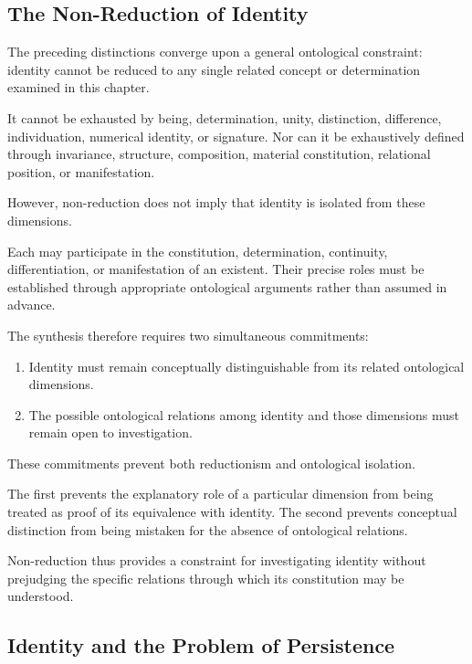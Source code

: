 \subsection{The Non-Reduction of Identity}

The preceding distinctions converge upon a general
ontological constraint: identity cannot be reduced
to any single related concept or determination
examined in this chapter.

It cannot be exhausted by being, determination,
unity, distinction, difference, individuation,
numerical identity, or signature. Nor can it be
exhaustively defined through invariance, structure,
composition, material constitution, relational
position, or manifestation.

However, non-reduction does not imply that identity
is isolated from these dimensions.

Each may participate in the constitution,
determination, continuity, differentiation, or
manifestation of an existent. Their precise roles
must be established through appropriate ontological
arguments rather than assumed in advance.

The synthesis therefore requires two simultaneous
commitments:

\begin{enumerate}
    \item Identity must remain conceptually
    distinguishable from its related ontological
    dimensions.

    \item The possible ontological relations among
    identity and those dimensions must remain open
    to investigation.
\end{enumerate}

These commitments prevent both reductionism and
ontological isolation.

The first prevents the explanatory role of a
particular dimension from being treated as proof
of its equivalence with identity. The second
prevents conceptual distinction from being
mistaken for the absence of ontological relations.

Non-reduction thus provides a constraint for
investigating identity without prejudging the
specific relations through which its constitution
may be understood.

\subsection{Identity and the Problem of Persistence}

